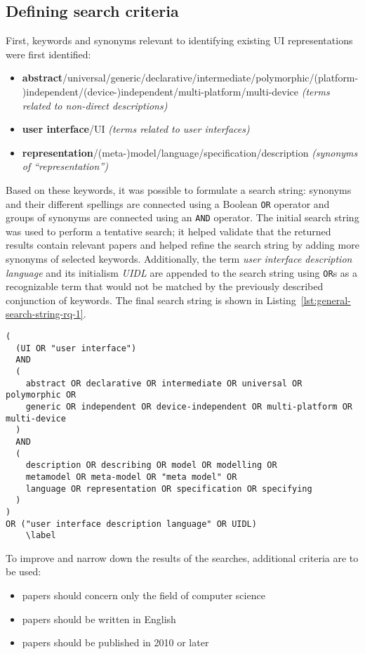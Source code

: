\subsection{Defining search criteria}\label{subsec:defining-search-criteria}
First, keywords and synonyms relevant to identifying existing UI representations were first identified:
\begin{itemize}
    \item \textbf{abstract}/universal/generic/declarative/intermediate/polymorphic/(platform-)independent/(device-)independent/multi-platform/multi-device\,\textendash\,\textit{(terms related to non-direct descriptions)}
    \item \textbf{user interface}/UI\,\textendash\,\textit{(terms related to user interfaces)}
    \item \textbf{representation}/(meta-)model/language/specification/description\,\textendash\,\textit{(synonyms of \enquote{representation})}
\end{itemize}
Based on these keywords, it was possible to formulate a search string: synonyms and their different spellings are connected using a Boolean \texttt{OR} operator and groups of synonyms are connected using an \texttt{AND} operator.
The initial search string was used to perform a tentative search;
it helped validate that the returned results contain relevant papers and helped refine the search string by adding more synonyms of selected keywords.
Additionally, the term \emph{user interface description language} and its initialism \emph{UIDL} are appended to the search string using \texttt{OR}s as a recognizable term that would not be matched by the previously described conjunction of keywords.
The final search string is shown in Listing~\ref{lst:general-search-string-rq-1}.
\begin{lstlisting}[label=lst:general-search-string-rq-1,caption=The search string, basicstyle=\ttfamily]
(
  (UI OR "user interface")
  AND
  (
    abstract OR declarative OR intermediate OR universal OR polymorphic OR
    generic OR independent OR device-independent OR multi-platform OR multi-device
  )
  AND
  (
    description OR describing OR model OR modelling OR
    metamodel OR meta-model OR "meta model" OR
    language OR representation OR specification OR specifying
  )
)
OR ("user interface description language" OR UIDL)
    \label
\end{lstlisting}

To improve and narrow down the results of the searches, additional criteria are to be used:
\begin{samepage}
\begin{itemize}
    \item papers should concern only the field of computer science
    \item papers should be written in English
    \item papers should be published in 2010 or later
\end{itemize}
\end{samepage}


